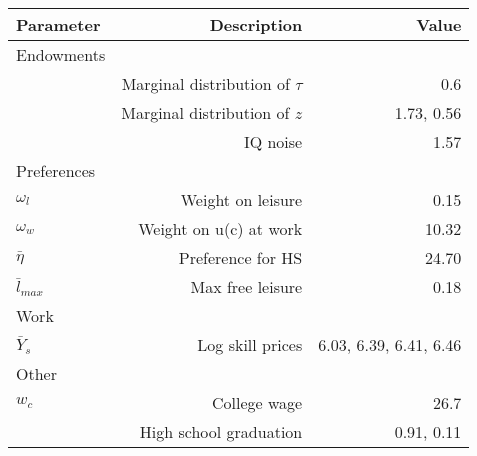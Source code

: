 \begin{tabular}{lrr}
\hline
Parameter & Description  & Value  \\ 
\hline
Endowments &   &   \\ 
 & Marginal distribution of $\tau$  & 0.6  \\ 
 & Marginal distribution of $z$  & 1.73, 0.56  \\ 
 & IQ noise  & 1.57  \\ 
Preferences &   &   \\ 
$\omega_{l}$ & Weight on leisure  & 0.15  \\ 
$\omega_{w}$ & Weight on u(c) at work  & 10.32  \\ 
$\bar{\eta}$ & Preference for HS  & 24.70  \\ 
$\bar{l}_{max}$ & Max free leisure  & 0.18  \\ 
Work &   &   \\ 
$\bar{Y}_{s}$ & Log skill prices  & 6.03, 6.39, 6.41, 6.46  \\ 
Other &   &   \\ 
$w_{c}$ & College wage  & 26.7  \\ 
 & High school graduation  & 0.91, 0.11  \\ 
\hline
\end{tabular}%
